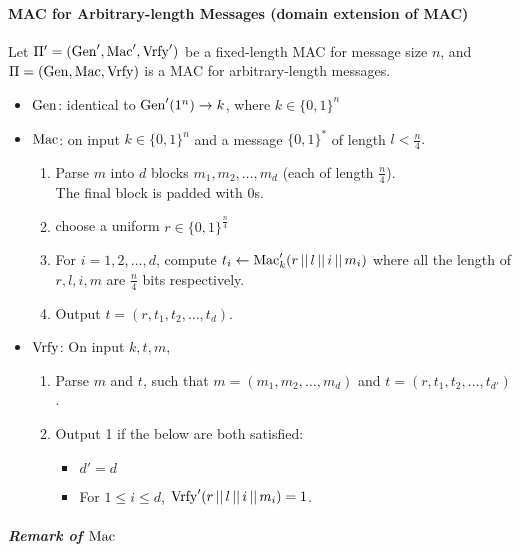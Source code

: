 \paragraph{MAC for Arbitrary-length Messages (domain extension of MAC)}

Let \(\Pi' = (\operatorname{Gen}', \operatorname{\mathrm{Mac}}', \operatorname{\mathrm{Vrfy}}')\) be a fixed-length MAC for message size \(n\), and \(\Pi = (\operatorname{Gen}, \operatorname{\mathrm{Mac}}, \operatorname{\mathrm{Vrfy}})\) is a MAC for arbitrary-length messages.

\begin{itemize}[itemsep=10pt]
	\item \(\operatorname{Gen}\): identical to \(\operatorname{Gen}'(1^n) \rightarrow k\), where \(k \in \{0, 1\}^n\)
	
	\item \(\operatorname{\mathrm{Mac}}\): on input \(k \in \{0, 1\}^n\) and a message \(\{0, 1\}^*\) of length \(l < \frac{n}{4}.\)
		\begin{enumerate}[label=(\roman*)]
			\item Parse \(m\) into \(d\) blocks \(m_1, m_2, \ldots, m_d\) (each of length \(\frac{n}{4}\)). \\
			The final block is padded with \(0\)s.
			\item choose a uniform \(r \in \{0, 1\}^{\frac{n}{4}}\)
			\item For \(i = 1, 2, \ldots, d\), compute \(t_i \leftarrow \operatorname{\mathrm{Mac}}'_k(r \, || \, l \, || \, i \, || \, m_i)\) where all the length of \(r, l, i, m\) are \(\frac{n}{4}\) bits respectively.
			\item Output \(t = (r, t_1, t_2, \ldots, t_d)\).
		\end{enumerate}

	\item \(\operatorname{\mathrm{Vrfy}}\): On input \(k, t, m\),
		\begin{enumerate}[label=(\roman*)]
			\item Parse \(m\) and \(t\), such that \(m = (m_1, m_2, \ldots, m_d)\) and \(t = (r, t_1, t_2, \ldots, t_{d'})\).
			\item Output 1 if the below are both satisfied:
			\begin{itemize}
				\item \(d' = d\)
				\item For \(1 \leq i \leq d\), \(\operatorname{\mathrm{Vrfy}}'(r \, || \, l \, || \, i \, || \, m_i) = 1\).
			\end{itemize}
		\end{enumerate}
\end{itemize}

\subparagraph{Remark of \(\operatorname{\mathrm{Mac}}\)}

